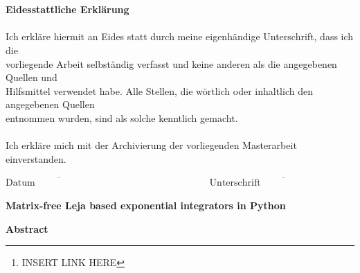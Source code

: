 \documentclass{scrartcl}
\begin{document}
{\begin{figure}[!htp]
\begin{flushright}
			\end{flushright}
		\end{figure}\\\\
		{\Large\textbf{Eidesstattliche Erklärung}}\\\\
		Ich erkläre hiermit an Eides statt durch meine eigenhändige Unterschrift, dass ich die\\ vorliegende Arbeit selbständig verfasst und keine anderen als die angegebenen Quellen und\\ Hilfsmittel verwendet habe. Alle Stellen, die wörtlich oder inhaltlich den angegebenen Quellen \\entnommen wurden, sind als solche kenntlich gemacht.\\\\
		Ich erkläre mich mit der Archivierung der vorliegenden Masterarbeit einverstanden.
		\vspace{40pt}\\
		\begin{center}
			\ensuremath{\overline{\mbox{Datum}\hspace{8em}}
				\hspace{10em}
				\overline{\mbox{Unterschrift}\hspace{10em}}
			}
			\thispagestyle{empty}
	\end{center}}
	\pagebreak
	
	
	
	\begin{center}\textbf{\Huge Matrix-free Leja based exponential integrators in Python}\end{center}
	\begin{center}\textbf{Abstract}\end{center}
	\begin{abstract}
		In this master thesis we develop an algorithm to approximate the action of a matrix exponential function for matrix-free linear operators. This is achieved by using a modified version of the real Leja method. We choose optimal interpolation parameters based on a spectral radius estimate computed by the power method. With this procedure we construct exponential Rosenbrock-type integrators to solve stiff advection-diffusion-reaction equations. We compare the performance of these integrators with other matrix-free differential equation solvers. 
 		As part of this thesis we publish the code for the matrix-free Leja method for the action of the matrix exponential function on GitHub \footnote{INSERT LINK HERE}.
	\end{abstract}
	
\end{document}
